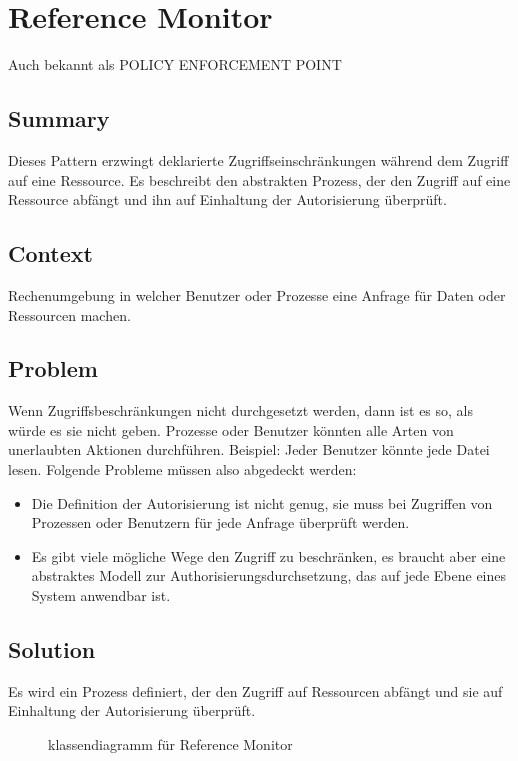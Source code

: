 \chapter{Reference Monitor}

Auch bekannt als POLICY ENFORCEMENT POINT

\section{Summary}
Dieses Pattern erzwingt deklarierte Zugriffseinschränkungen während dem Zugriff auf eine Ressource. Es beschreibt den abstrakten Prozess, der den Zugriff auf eine Ressource abfängt und ihn auf Einhaltung der Autorisierung überprüft.

\section{Context}
Rechenumgebung in welcher Benutzer oder Prozesse eine Anfrage für Daten oder Ressourcen machen.

\section{Problem}
Wenn Zugriffsbeschränkungen nicht durchgesetzt werden, dann ist es so, als würde es sie nicht geben. Prozesse oder Benutzer könnten alle Arten von unerlaubten Aktionen durchführen. Beispiel: Jeder Benutzer könnte jede Datei lesen.  Folgende Probleme müssen also abgedeckt werden:
\begin{itemize}
  \item Die Definition der Autorisierung ist nicht genug, sie muss bei Zugriffen von Prozessen oder Benutzern für jede Anfrage überprüft werden.
  \item Es gibt viele mögliche Wege den Zugriff zu beschränken, es braucht aber eine abstraktes Modell zur Authorisierungsdurchsetzung, das auf jede Ebene eines System anwendbar ist.
\end{itemize}

\section{Solution}
Es wird ein Prozess definiert, der den Zugriff auf Ressourcen abfängt und sie auf Einhaltung der Autorisierung überprüft.

\begin{figure}[H]
  \centering
  
  \caption{klassendiagramm f\"ur Reference Monitor}
\end{figure}

